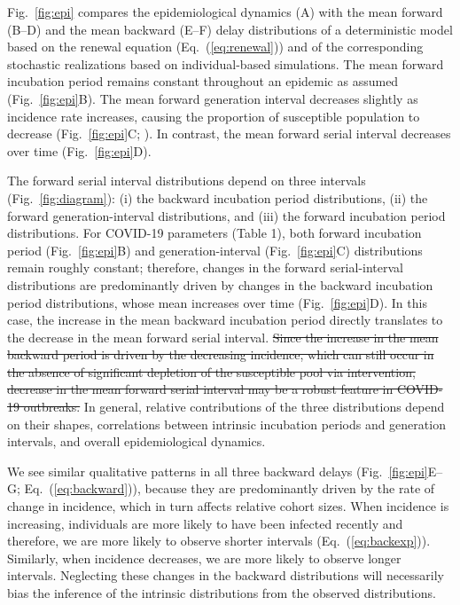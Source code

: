 \documentclass[12pt]{article}
\newcommand{\eref}[1]{Eq.~(\ref{eq:#1})} %
\newcommand{\fref}[1]{Fig.~\ref{fig:#1}}
\providecommand{\DIFdeltex}[1]{{\protect\color{red}\sout{#1}}}                      %
\providecommand{\DIFdelbegin}{} %
\providecommand{\DIFdelend}{} %
\providecommand{\DIFdel}[1]{\texorpdfstring{\DIFdeltex{#1}}{}} %
\newcommand{\DIFscaledelfig}{0.5}
\newlength{\DIFdelgraphicswidth} %
\newlength{\DIFdelgraphicsheight} %
\newcommand{\DIFdelincludegraphics}[2][]{%
\sbox{\DIFdelgraphicsbox}{\DIFOincludegraphics[#1]{#2}}%
\settoboxwidth{\DIFdelgraphicswidth}{\DIFdelgraphicsbox} %
\settoboxtotalheight{\DIFdelgraphicsheight}{\DIFdelgraphicsbox} %
\scalebox{\DIFscaledelfig}{%
\parbox[b]{\DIFdelgraphicswidth}{\usebox{\DIFdelgraphicsbox}\\[-\baselineskip] \rule{\DIFdelgraphicswidth}{0em}}\llap{\resizebox{\DIFdelgraphicswidth}{\DIFdelgraphicsheight}{%
\setlength{\unitlength}{\DIFdelgraphicswidth}%
\begin{picture}(1,1)%
\thicklines\linethickness{2pt} %
{\color[rgb]{1,0,0}\put(0,0){\framebox(1,1){}}}%
{\color[rgb]{1,0,0}\put(0,0){\line( 1,1){1}}}%
{\color[rgb]{1,0,0}\put(0,1){\line(1,-1){1}}}%
\end{picture}%
}\hspace*{3pt}}} %
} %
\DeclareRobustCommand{\DIFdelbegin}{\DIFOdelbegin \let\includegraphics\DIFdelincludegraphics} %
\DeclareRobustCommand{\DIFdelend}{\DIFOaddend \let\includegraphics\DIFOincludegraphics} %
\begin{document}
\fref{epi} compares the epidemiological dynamics (A) with the mean forward (B--D) and the mean backward (E--F) delay distributions of a deterministic model based on the renewal equation (\eref{renewal}) and of the corresponding stochastic realizations based on individual-based simulations.
The mean forward incubation period remains constant throughout an epidemic as assumed (\fref{epi}B).
The mean forward generation interval decreases slightly as incidence rate increases, causing the proportion of susceptible population to decrease (\fref{epi}C; \cite{kenah2008generation, champredon2015intrinsic}).
In contrast, the mean forward serial interval decreases over time (\fref{epi}D).

The forward serial interval distributions depend on three intervals (\fref{diagram}): (i) the backward incubation period distributions, (ii) the forward generation-interval distributions, and (iii) the forward incubation period distributions.
For COVID-19 parameters (Table 1), both forward incubation period (\fref{epi}B) and generation-interval (\fref{epi}C) distributions remain roughly constant;
therefore, changes in the forward serial-interval distributions are predominantly driven by changes in the backward incubation period distributions, whose mean increases over time (\fref{epi}D).
In this case, the increase in the mean backward incubation period directly translates to the decrease in the mean forward serial interval.
\DIFdelbegin \DIFdel{Since the increase in the mean backward period is driven by the decreasing incidence, which can still occur in the absence of significant depletion of the susceptible pool via intervention, decrease in the mean forward serial interval may be a robust feature in COVID-19 outbreaks.
}\DIFdelend %
In general, relative contributions of the three distributions depend on their shapes, correlations between intrinsic incubation periods and generation intervals, and overall epidemiological dynamics.

We see similar qualitative patterns in all three backward delays (\fref{epi}E--G; \eref{backward}), because they are predominantly driven by the rate of change in incidence, which in turn affects relative cohort sizes.
When incidence is increasing, individuals are more likely to have been infected recently and therefore, we are more likely to observe shorter intervals (\eref{backexp}).
Similarly, when incidence decreases, we are more likely to observe longer intervals.
Neglecting these changes in the backward distributions will necessarily bias the inference of the intrinsic distributions from the observed distributions.
\end{document}

